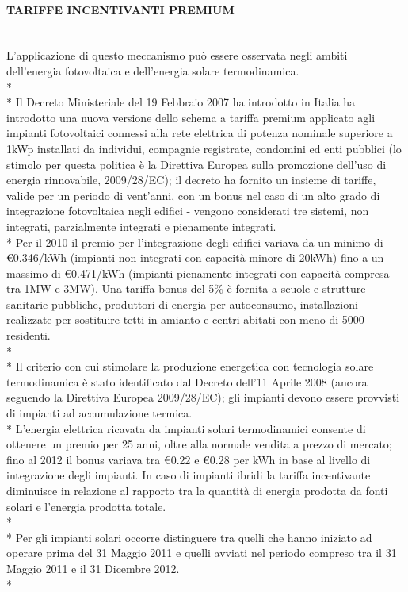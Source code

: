 \documentclass[12pt,a4paper,openright,twoside]{report}
\newcommand{\myparagraph}[1]{\paragraph{#1}\mbox{}\\}
\begin{document}
\myparagraph{TARIFFE INCENTIVANTI PREMIUM}
L'applicazione di questo meccanismo può essere osservata negli ambiti dell'energia fotovoltaica e dell'energia solare termodinamica. \\*\\*
Il Decreto Ministeriale del 19 Febbraio 2007 ha introdotto in Italia ha introdotto una nuova versione dello schema a tariffa premium applicato agli impianti fotovoltaici connessi alla rete elettrica di potenza nominale superiore a 1kWp installati da individui, compagnie registrate, condomini ed enti pubblici (lo stimolo per questa politica è la Direttiva Europea sulla promozione dell'uso  di energia rinnovabile, 2009/28/EC); il decreto ha fornito un insieme di tariffe, valide per un periodo di vent'anni, con un bonus nel caso di un alto grado di integrazione fotovoltaica negli edifici - vengono considerati tre sistemi, non integrati, parzialmente integrati e pienamente integrati.\\*
Per il 2010 il premio per l'integrazione degli edifici variava da un minimo di \euro0.346/kWh (impianti non integrati con capacità minore di 20kWh) fino a un massimo di \euro0.471/kWh (impianti pienamente integrati con capacità compresa tra 1MW e 3MW). Una tariffa bonus del 5\% è fornita a scuole e strutture sanitarie pubbliche, produttori di energia per autoconsumo, installazioni realizzate per sostituire tetti in amianto e centri abitati con meno di 5000 residenti.
\\*\\*
Il criterio con cui stimolare la produzione energetica con tecnologia solare termodinamica è stato identificato dal Decreto dell'11 Aprile 2008 (ancora seguendo la Direttiva Europea 2009/28/EC); gli impianti devono essere provvisti di impianti ad accumulazione termica.\\* 
L'energia elettrica ricavata da impianti solari termodinamici consente di ottenere un premio per 25 anni, oltre alla normale vendita a prezzo di mercato; fino al 2012 il bonus variava tra \euro0.22 e \euro0.28 per kWh in base al livello di integrazione degli impianti. In caso di impianti ibridi la tariffa incentivante diminuisce in relazione al rapporto tra la quantità di energia prodotta da fonti solari e l'energia prodotta totale.\\*\\*
Per gli impianti solari occorre distinguere tra quelli che hanno iniziato ad operare prima del 31 Maggio 2011 e quelli avviati nel periodo compreso tra il 31 Maggio 2011 e il 31 Dicembre 2012.\\*
\end{document}
